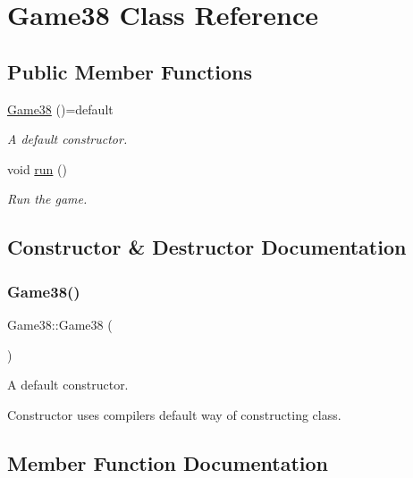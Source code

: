 \hypertarget{classGame}{}\section{Game38 Class Reference}
\label{classGame}
\subsection*{Public Member Functions}
\begin{DoxyCompactItemize}
\item 
\hyperlink{classGame_a4735989677c1cab18866f3ae4ee0aa1c}{Game38} ()=default
\begin{DoxyCompactList}\small\item\em A default constructor. \end{DoxyCompactList}\item 
void \hyperlink{classGame_a1ab78f5ed0d5ea879157357cf2fb2afa}{run} ()
\begin{DoxyCompactList}\small\item\em Run the game. \end{DoxyCompactList}\end{DoxyCompactItemize}


\subsection{Constructor \& Destructor Documentation}
\mbox{\label{classGame_a4735989677c1cab18866f3ae4ee0aa1c}} 
\subsubsection{\texorpdfstring{Game38()}{Game38()}}
{\footnotesize\ttfamily Game38\+::\+Game38 (\begin{DoxyParamCaption}{ }\end{DoxyParamCaption})\hspace{0.3cm}{\ttfamily [default]}}



A default constructor. 

Constructor uses compiler\textquotesingle{}s default way of constructing class. 

\subsection{Member Function Documentation}
\mbox{\label{classGame_a1ab78f5ed0d5ea879157357cf2fb2afa}} 
